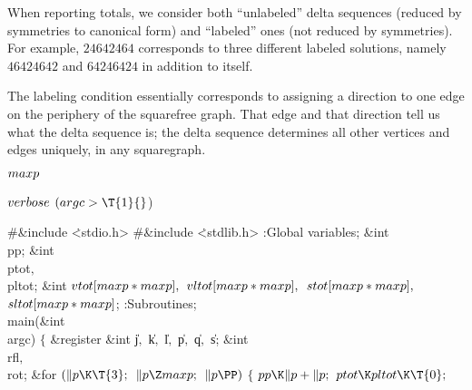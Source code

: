 When reporting totals, we consider both ``unlabeled'' delta sequences
(reduced by symmetries to canonical form) and ``labeled'' ones
(not reduced by symmetries). For example, $24642464$ corresponds to
three different labeled solutions, namely $46424642$ and $64246424$
in addition to itself.

The labeling condition essentially corresponds to assigning a direction
to one edge on the periphery of the squarefree graph. That edge and
that direction tell us what the delta sequence is; the delta sequence
determines all other vertices and edges uniquely, in any squaregraph.

\Y\B\4\D$\\{maxp}$ \5
\par
\B\4\D$\\{verbose}$ \5
$(\\{argc}>\T{1}{}$)\par
\Y\B\8\#\&{include} \.{<stdio.h>}\6
\8\#\&{include} \.{<stdlib.h>}\6
:Global variables\X;\7
\&{int} \\{pp};\6
\&{int} \\{ptot}${},{}$ \\{pltot};\6
\&{int} ${}\\{vtot}[\\{maxp}*\\{maxp}],{}$ ${}\\{vltot}[\\{maxp}*\\{maxp}],{}$
${}\\{stot}[\\{maxp}*\\{maxp}],{}$ ${}\\{sltot}[\\{maxp}*\\{maxp}]{}$;\7
:Subroutines\X;\7
\\{main}(\&{int} \\{argc})\1\1\2\2\6
${}\{{}$\1\6
\&{register} \&{int} \|j${},{}$ \|k${},{}$ \|l${},{}$ \|p${},{}$ \|q${},{}$ %
\|s;\6
\&{int} \\{rfl}${},{}$ \\{rot};\7
\&{for} ${}(\|p\K\T{3};{}$ ${}\|p\Z\\{maxp};{}$ ${}\|p\PP){}$\5
${}\{{}$\1\6
${}\\{pp}\K\|p+\|p;{}$\6
${}\\{ptot}\K\\{pltot}\K\T{0};{}$\6
